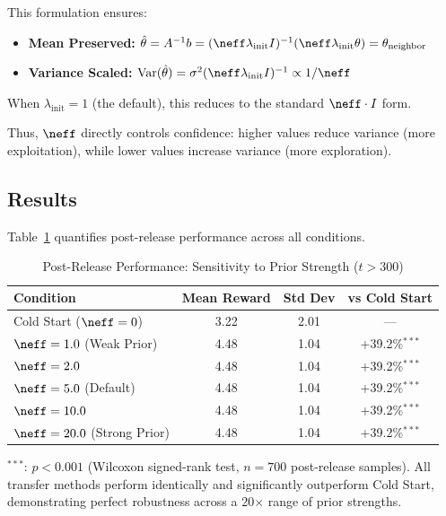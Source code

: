 This formulation ensures:
\begin{itemize}[leftmargin=*,noitemsep]
    \item \textbf{Mean Preserved:} $\hat{\theta} = A^{-1}b = (\neff \lambda_{\text{init}} I)^{-1}(\neff \lambda_{\text{init}} \theta) = \theta_{\text{neighbor}}$
    \item \textbf{Variance Scaled:} $\text{Var}(\hat{\theta}) = \sigma^2 (\neff \lambda_{\text{init}} I)^{-1} \propto 1/\neff$
\end{itemize}

When $\lambda_{\text{init}} = 1$ (the default), this reduces to the standard
$\neff \cdot I$ form.

Thus, $\neff$ directly controls confidence: higher values reduce variance 
(more exploitation), while lower values increase variance (more exploration).

\subsection{Results}

Table~\ref{tab:sensitivity_appendix} 
quantifies post-release performance across all conditions.

\begin{table}[h]
\centering
\caption{Post-Release Performance: Sensitivity to Prior Strength ($t > 300$)}
\label{tab:sensitivity_appendix}
\begin{tabular}{lccc}
\toprule
\textbf{Condition} & \textbf{Mean Reward} & \textbf{Std Dev} & \textbf{vs Cold Start} \\
\midrule
Cold Start ($\neff=0$) & 3.22 & 2.01 & --- \\
\midrule
$\neff=1.0$ (Weak Prior) & 4.48 & 1.04 & +39.2\%$^{***}$ \\
$\neff=2.0$ & 4.48 & 1.04 & +39.2\%$^{***}$ \\
$\neff=5.0$ (Default) & 4.48 & 1.04 & +39.2\%$^{***}$ \\
$\neff=10.0$ & 4.48 & 1.04 & +39.2\%$^{***}$ \\
$\neff=20.0$ (Strong Prior) & 4.48 & 1.04 & +39.2\%$^{***}$ \\
\bottomrule
\end{tabular}
\vspace{0.5em}

\footnotesize
$^{***}$: $p < 0.001$ (Wilcoxon signed-rank test, $n=700$ post-release samples). 
All transfer methods perform identically and significantly outperform Cold Start, 
demonstrating perfect robustness across a 20$\times$ range of prior strengths.
\end{table}

